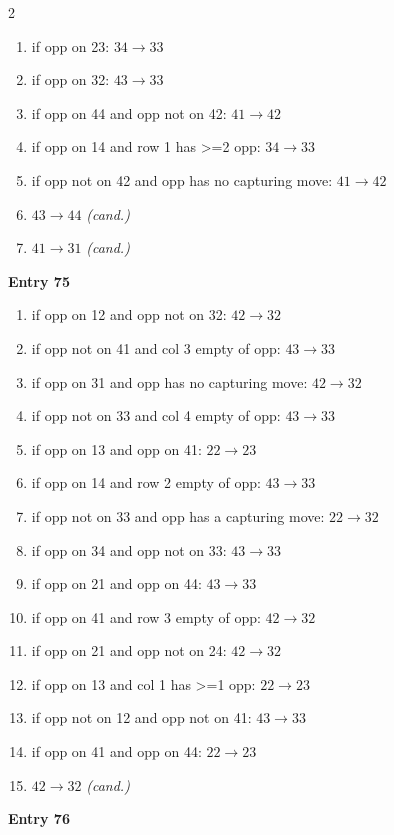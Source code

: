 \begin{multicols}{2}
\begin{tikzpicture}[scale=0.24]
\end{tikzpicture}
\nopagebreak\begin{enumerate}[topsep=1pt,itemsep=0pt,parsep=0pt,leftmargin=2.2em,label=\arabic*.]
\item if opp on 23: $34\!\to\!33$
\item if opp on 32: $43\!\to\!33$
\item if opp on 44 and opp not on 42: $41\!\to\!42$
\item if opp on 14 and row 1 has >=2 opp: $34\!\to\!33$
\item if opp not on 42 and opp has no capturing move: $41\!\to\!42$
\item $43\!\to\!44$ \hfill\textit{(cand.)}
\item $41\!\to\!31$ \hfill\textit{(cand.)}
\end{enumerate}\smallskip
\noindent\textbf{Entry 75} \; 
\nopagebreak\begin{enumerate}[topsep=1pt,itemsep=0pt,parsep=0pt,leftmargin=2.2em,label=\arabic*.]
\item if opp on 12 and opp not on 32: $42\!\to\!32$
\item if opp not on 41 and col 3 empty of opp: $43\!\to\!33$
\item if opp on 31 and opp has no capturing move: $42\!\to\!32$
\item if opp not on 33 and col 4 empty of opp: $43\!\to\!33$
\item if opp on 13 and opp on 41: $22\!\to\!23$
\item if opp on 14 and row 2 empty of opp: $43\!\to\!33$
\item if opp not on 33 and opp has a capturing move: $22\!\to\!32$
\item if opp on 34 and opp not on 33: $43\!\to\!33$
\item if opp on 21 and opp on 44: $43\!\to\!33$
\item if opp on 41 and row 3 empty of opp: $42\!\to\!32$
\item if opp on 21 and opp not on 24: $42\!\to\!32$
\item if opp on 13 and col 1 has >=1 opp: $22\!\to\!23$
\item if opp not on 12 and opp not on 41: $43\!\to\!33$
\item if opp on 41 and opp on 44: $22\!\to\!23$
\item $42\!\to\!32$ \hfill\textit{(cand.)}
\end{enumerate}\smallskip
\noindent\textbf{Entry 76} \; 
\end{multicols}
